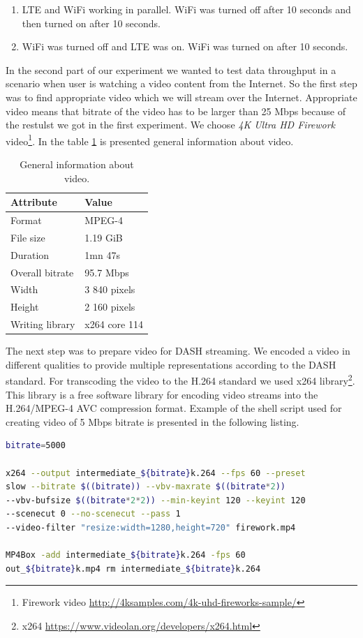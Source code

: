 \documentclass{llncs}
\begin{document}
\begin{enumerate}
\item{LTE and WiFi working in parallel. WiFi was turned off after 10 seconds and then turned on after 10 seconds.}
\item{WiFi was turned off and LTE was on. WiFi was turned on after 10 seconds.}
\end{enumerate}

In the second part of our experiment we wanted to test data throughput in a scenario when user is watching a video content from the Internet. So the first step was to find appropriate video which we will stream over the Internet. Appropriate video means that bitrate of the video has to be larger than 25 Mbps because of the  restulst we got in the first experiment. We choose \emph{4K Ultra HD Firework }video\footnote{Firework video \url{http://4ksamples.com/4k-uhd-fireworks-sample/}}. In the table \ref{tab:video} is presented general information about video. 

\begin{table}
\centering
\begin{tabular}{l|l}
Attribute & Value \\\hline
Format & MPEG-4 \\
File size & 1.19 GiB \\
Duration & 1mn 47s \\ 
Overall bitrate & 95.7 Mbps \\
Width & 3 840 pixels \\
Height & 2 160 pixels \\
Writing library \hspace{10mm}  &  x264 core 114 \\
\end{tabular}
\caption{\label{tab:video}General information about video.}
\end{table}

The next step was to prepare video for DASH streaming. We encoded a video in different qualities to provide multiple representations according to the DASH standard. For transcoding the video to the H.264 standard we used x264 library\footnote{x264 \url{https://www.videolan.org/developers/x264.html}}. This library is a free software library for encoding video streams into the H.264/MPEG-4 AVC compression format. Example of the shell script used for creating video of 5 Mbps bitrate is presented in the following listing.

\begin{lstlisting}[language=bash, caption={\label{l:script}Shell script for encoding the video.}, captionpos=b]
bitrate=5000

x264 --output intermediate_${bitrate}k.264 --fps 60 --preset
slow --bitrate $((bitrate)) --vbv-maxrate $((bitrate*2)) 
--vbv-bufsize $((bitrate*2*2)) --min-keyint 120 --keyint 120 
--scenecut 0 --no-scenecut --pass 1 
--video-filter "resize:width=1280,height=720" firework.mp4

MP4Box -add intermediate_${bitrate}k.264 -fps 60
out_${bitrate}k.mp4 rm intermediate_${bitrate}k.264

\end{lstlisting} 
\end{document}
